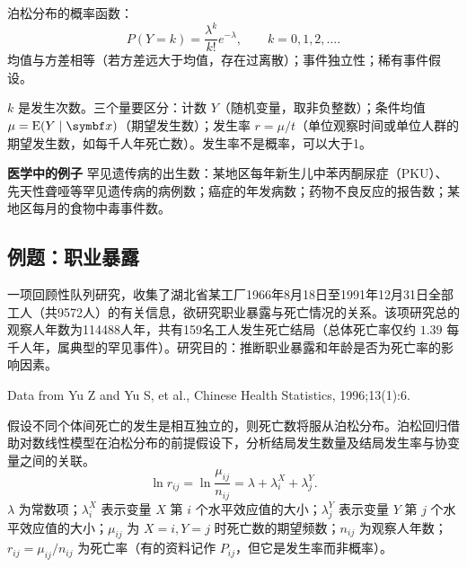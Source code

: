 泊松分布的概率函数：
\[
P(Y=k)=\frac{\lambda^k}{k!}e^{-\lambda},\qquad k=0,1,2,\ldots.
\]
均值与方差相等（若方差远大于均值，存在过离散）；事件独立性；稀有事件假设。
\begin{annotation}$k$ 是发生次数。三个量要区分：计数 $Y$（随机变量，取非负整数）；条件均值 $\mu=\E(Y\mid\bm x)$（期望发生数）；发生率 $r=\mu/t$（单位观察时间或单位人群的期望发生数，如每千人年死亡数）。发生率不是概率，可以大于1。\end{annotation}
\textbf{医学中的例子} 罕见遗传病的出生数：某地区每年新生儿中苯丙酮尿症（PKU）、先天性聋哑等罕见遗传病的病例数；癌症的年发病数；药物不良反应的报告数；某地区每月的食物中毒事件数。
\subsection{例题：职业暴露}
一项回顾性队列研究，收集了湖北省某工厂1966年8月18日至1991年12月31日全部工人（共9572人）的有关信息，欲研究职业暴露与死亡情况的关系。该项研究总的观察人年数为114488人年，共有159名工人发生死亡结局（总体死亡率仅约 $1.39$ 每千人年，属典型的罕见事件）。研究目的：推断职业暴露和年龄是否为死亡率的影响因素。
\begin{center}\footnotesize Data from Yu Z and Yu S, et al., Chinese Health Statistics, 1996;13(1):6.\end{center}
假设不同个体间死亡的发生是相互独立的，则死亡数将服从泊松分布。泊松回归借助对数线性模型在泊松分布的前提假设下，分析结局发生数量及结局发生率与协变量之间的关联。
\[
\ln r_{ij}=\ln\frac{\mu_{ij}}{n_{ij}}=\lambda+\lambda_i^X+\lambda_j^Y.
\]
$\lambda$ 为常数项；$\lambda_i^X$ 表示变量 $X$ 第 $i$ 个水平效应值的大小；$\lambda_j^Y$ 表示变量 $Y$ 第 $j$ 个水平效应值的大小；$\mu_{ij}$ 为 $X=i,Y=j$ 时死亡数的期望频数；$n_{ij}$ 为观察人年数；$r_{ij}=\mu_{ij}/n_{ij}$ 为死亡率（有的资料记作 $P_{ij}$，但它是发生率而非概率）。
